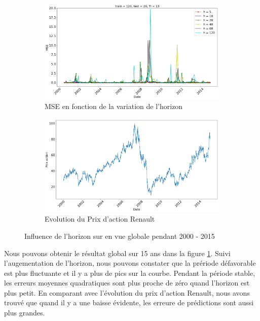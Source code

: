 \begin{figure}[H]
	\centering
	\begin{subfigure}{.5\textwidth}
	\includegraphics[width=.9\linewidth, scale=0.2]
	{plot/MSE_120_h_20.png}
	\caption{MSE en fonction de la variation de l'horizon}
	\label{fig:Horizon}
	\end{subfigure}%
	\begin{subfigure}{.5\textwidth}
	\centering
	\includegraphics[width=.9\linewidth, scale=0.2]
	{plot/Prix_action_global.png}
	\caption{Evolution du Prix d'action Renault}
	\label{fig:Prix_action}
	\end{subfigure}
\caption{Influence de l'horizon sur en vue globale pendant 2000 - 2015}
\label{fig:Horizon_global}
\end{figure}

Nous pouvons obtenir le résultat global sur 15 ans dans la figure \ref{fig:Horizon}. Suivi l'augementation de l'horizon, nous pouvons constater que la prériode défavorable est plus fluctuante et il y a plus de pics sur la courbe. Pendant la période stable, les erreurs moyennes quadratiques sont plus proche de zéro quand l'horizon est plus petit. En comparant avec l'évolution du prix d'action Renault, nous avons trouvé que quand il y a une baisse évidente, les erreure de prédictions sont aussi plus grandes. \\


